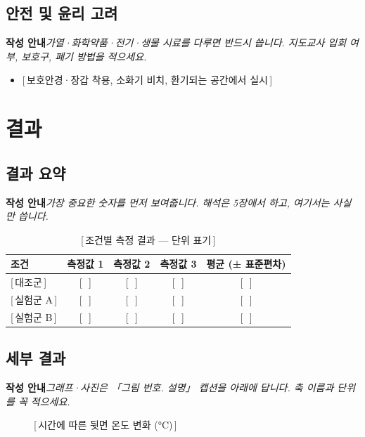 \documentclass[11pt,a4paper]{article}
\newcommand{\guide}[1]{\par{\small\color{leaf}\sffamily\bfseries 작성 안내\quad}{\small\color{mute}\itshape #1}\par\smallskip}
\newcommand{\ph}[1]{{\color{ph}[\,#1\,]}}
\newcommand{\tcell}[1]{\sffamily\bfseries\color{forest}#1}
\begin{document}
\subsection{안전 및 윤리 고려}
\guide{가열·화학약품·전기·생물 시료를 다루면 반드시 씁니다. 지도교사 입회 여부, 보호구, 폐기 방법을 적으세요.}
\begin{itemize}\item \ph{보호안경·장갑 착용, 소화기 비치, 환기되는 공간에서 실시}\end{itemize}

\section{결과}
\subsection{결과 요약}
\guide{가장 중요한 숫자를 먼저 보여줍니다. 해석은 5장에서 하고, 여기서는 사실만 씁니다.}
\begin{table}[h]\centering
\caption{\ph{조건별 측정 결과 — 단위 표기}}
\begin{tabular}{l c c c c}
\toprule
\rowcolor{head}\tcell{조건} & \tcell{측정값 1} & \tcell{측정값 2} & \tcell{측정값 3} & \tcell{평균 (± 표준편차)} \\
\midrule
\ph{대조군} & \ph{ } & \ph{ } & \ph{ } & \ph{ } \\
\ph{실험군 A} & \ph{ } & \ph{ } & \ph{ } & \ph{ } \\
\ph{실험군 B} & \ph{ } & \ph{ } & \ph{ } & \ph{ } \\
\bottomrule
\end{tabular}
\end{table}

\subsection{세부 결과}
\guide{그래프·사진은 「그림 번호. 설명」 캡션을 아래에 답니다. 축 이름과 단위를 꼭 적으세요.}
\begin{figure}[h]\centering
{}
\caption{\ph{시간에 따른 뒷면 온도 변화 (\si{\celsius})}}
\end{figure}

\end{document}
